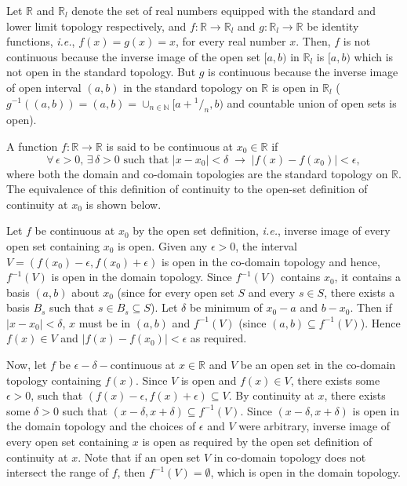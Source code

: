 \documentclass[a4paper,english,12pt]{article}
\begin{document}
\begin{exmp}
Let $\mathbb{R}$ and $\mathbb{R}_l$ denote the set of real numbers equipped with the standard and lower limit topology respectively, and $f:\mathbb{R}\to \mathbb{R}_l$ and $g:\mathbb{R}_l\to \mathbb{R}$ be identity functions, \emph{i.e.}, $f(x)=g(x)=x$, for every real number $x$. Then, $f$ is not continuous because the inverse image of the open set $[a,b)$ in $\mathbb{R}_l$ is $[a,b)$ which is not open in the standard topology. But $g$ is continuous because the inverse image of open interval $(a,b)$ in the standard topology on $\mathbb{R}$ is open in $\mathbb{R}_l$ ($g^{-1}((a,b))=(a,b)=\cup _{n\in \mathbb{N}}[a+\!^1/_n,b)$ and countable union of open sets is open).
\label{lower_lt}
\end{exmp}

\begin{exmp}
A function $f:\mathbb{R}\to \mathbb{R}$ is said to be continuous at $x_0\in \mathbb{R}$ if 
\begin{equation*}
\forall\,\epsilon>0,\,\exists\,\delta>0 \text{ such that } |x-x_0|<\delta\;\to\;|f(x)-f(x_0)|<\epsilon,
\end{equation*}
where both the domain and co-domain topologies are the standard topology on $\mathbb{R}$. The equivalence of this definition of continuity to the open-set definition of continuity at $x_0$ is shown below.

Let $f$ be continuous at $x_0$ by the open set definition, \emph{i.e.}, inverse image of every open set containing $x_0$ is open. Given any $\epsilon>0$, the interval $V=(f(x_0)-\epsilon,f(x_0)+\epsilon)$ is open in the co-domain topology and hence, $f^{-1}(V)$ is open in the domain topology. Since $f^{-1}(V)$ contains $x_0$, it contains a basis $(a,b)$ about $x_0$ (since for every open set $S$ and every $s\in S$, there exists a basis $B_s$ such that $s\in B_s\subseteq S$). Let $\delta$ be minimum of $x_0-a$ and $b-x_0$. Then if $|x-x_0|<\delta$, $x$ must be in $(a,b)$ and $f^{-1}(V)$ (since $(a,b)\subseteq f^{-1}(V)$). Hence $f(x)\in V$ and $|f(x)-f(x_0)|<\epsilon$ as required.

Now, let $f$ be $\epsilon-\delta-$continuous at $x\in \mathbb{R}$ and $V$ be an open set in the co-domain topology containing $f(x)$. Since $V$ is open and $f(x)\in V$, there exists some $\epsilon>0$, such that $(f(x)-\epsilon,f(x)+\epsilon)\subseteq V$. By continuity at $x$, there exists some $\delta>0$ such that $(x-\delta,x+\delta)\subseteq f^{-1}(V)$. Since $(x-\delta,x+\delta)$ is open in the domain topology and the choices of $\epsilon$ and $V$ were arbitrary, inverse image of every open set containing $x$ is open as required by the open set definition of continuity at $x$. Note that if an open set $V$ in co-domain topology does not intersect the range of $f$, then $f^{-1}(V)=\emptyset$, which is open in the domain topology. 
\end{exmp}
\end{document}
